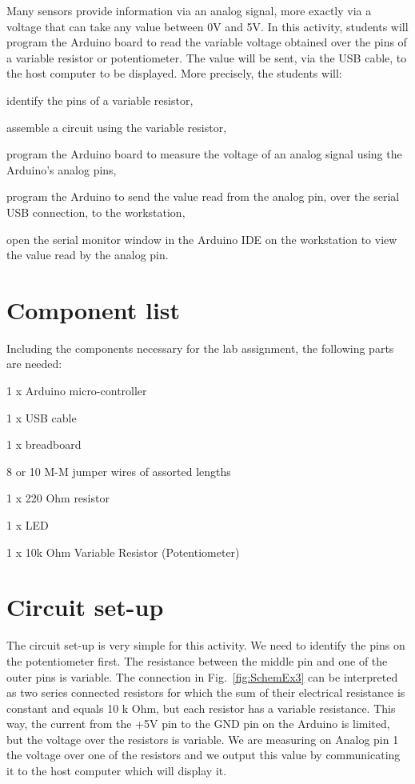 \documentclass[12pt]{book}
\begin{document}
Many sensors provide information via an analog signal, more exactly
via a voltage that can take any value between 0V and 5V. In this
activity, students will program the Arduino board to read the variable
voltage obtained over the pins of a variable resistor or
potentiometer. The value will be sent, via the USB
cable, to the host computer to be
displayed. More precisely, the students will:
\begin{compactitem}[--]
\item identify the pins of a variable resistor,
\item assemble a circuit using the variable resistor,
\item program the Arduino board to measure the voltage of an analog
  signal using the Arduino's analog pins,
\item program the Arduino to send the value read from the analog pin,
  over the serial USB connection, to the workstation,
\item open the serial monitor window in the Arduino IDE on the 
  workstation to view the value read by the analog pin.
\end{compactitem}


\section{Component list}

Including the components necessary for the lab assignment, the following
parts are needed:
\begin{compactitem}[--]
  \item 1 x Arduino micro-controller
  \item 1 x USB cable
  \item 1 x breadboard
  \item 8 or 10 M-M jumper wires of assorted lengths
	\item 1 x 220 Ohm resistor
	\item 1 x LED
  \item 1 x 10k Ohm Variable Resistor (Potentiometer)
\end{compactitem}


\section{Circuit set-up}

The circuit set-up is very simple for this activity. We need to
identify the pins on the potentiometer first. The resistance between
the middle pin and one of the outer pins is variable. The connection
in Fig.~\ref*{fig:SchemEx3} can be interpreted as two series connected
resistors for which the sum of their electrical resistance is constant
and equals 10 k Ohm, but each resistor has a variable resistance. This
way, the current from the +5V pin to the GND pin on the Arduino is
limited, but the voltage over the resistors is variable. We are
measuring on Analog pin 1 the voltage over one of the resistors and we
output this value by communicating it to the host computer which will
display it.
\end{document}
